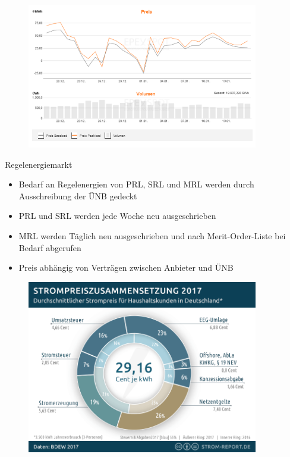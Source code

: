 \documentclass[aspectratio=1610, professionalfonts, 9pt]{beamer}
\begin{document}
\begin{frame}
  \begin{figure}
  \includegraphics[width=0.9\textwidth]{images/Phelix_1monat.PNG}
\end{figure}
\end{frame}


\begin{frame}{Regelenergiemarkt}
\begin{itemize}
  \item Bedarf an Regelenergien von PRL, SRL und MRL werden durch Ausschreibung
der ÜNB gedeckt
\item PRL und SRL werden jede Woche neu ausgeschrieben
\item MRL werden Täglich neu ausgeschrieben und nach Merit-Order-Liste bei Bedarf abgerufen
\item Preis abhängig von Verträgen zwischen Anbieter und ÜNB
\end{itemize}
\end{frame}


\begin{frame}
  \begin{figure}
  \includegraphics[width=0.9\textwidth]{images/strompreis-zusammensetzung.png}
  \end{figure}
\end{frame}
\end{document}

